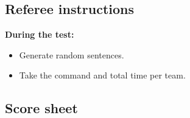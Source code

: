 \subsection{Referee instructions}
\textbf{During the test:}
\begin{itemize}
	\item Generate random sentences. %
	\item Take the command and total time per team.
\end{itemize}


\newpage
\subsection{Score sheet}




